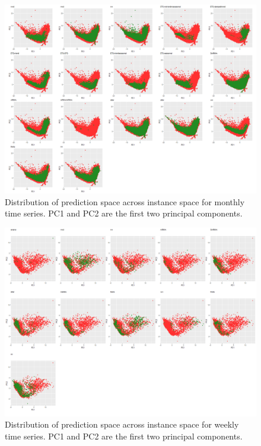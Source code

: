 \documentclass[11pt,a4paper,]{article}
\theoremstyle{definition}
\theoremstyle{definition}
\theoremstyle{definition}
\theoremstyle{remark}
\begin{document}
\newpage

\begin{figure}
\centering
\includegraphics{figures/monthlypca-1.png}
\caption{\label{fig:monthlypca}Distribution of prediction space across
instance space for monthly time series. PC1 and PC2 are the first two
principal components.}
\end{figure}

\clearpage

\begin{figure}[h]

{\centering \includegraphics{figures/pcaweekly-1} 

}

\caption{Distribution of prediction space across instance space for weekly time series. PC1 and PC2 are the first two principal components.}\label{fig:pcaweekly}
\end{figure}
\end{document}
